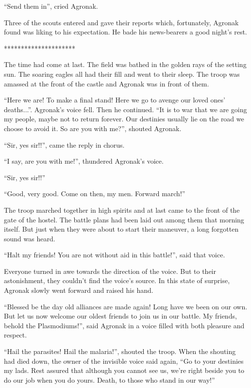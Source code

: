 \documentclass[twoside,11pt,titlepage]{article}
\begin{document}
``Send them in'', cried Agronak.

Three of the scouts entered and gave their reports which, fortunately, Agronak found was liking to his expectation. He bade his news-bearers a good night's rest.

\bigskip
\begin{center}
*********************
\end{center}

The time had come at last. The field was bathed in the golden rays of the setting sun. The soaring eagles all had their fill and went to their sleep. The troop was amassed at the front of the castle and Agronak was in front of them.

``Here we are! To make a final stand! Here we go to avenge our loved ones' deaths...''. Agronak's voice fell. Then he continued. ``It is to war that we are going my people, maybe not to return forever. Our destinies usually lie on the road we choose to avoid it. So are you with me?'', shouted Agronak.

``Sir, yes sir!!'', came the reply in chorus.

``I say, are you with me!'', thundered Agronak's voice.

``Sir, yes sir!!''

``Good, very good. Come on then, my men. Forward march!''

The troop marched together in high spirits and at last came to the front of the gate of the hostel. The battle plans had been laid out among them that morning itself. But just when they were about to start their maneuver, a long forgotten sound was heard.

``Halt my friends! You are not without aid in this battle!'', said that voice.

Everyone turned in awe towards the direction of the voice. But to their astonishment, they couldn't find the voice's source. In this state of surprise, Agronak slowly went forward and raised his hand.

``Blessed be the day old alliances are made again! Long have we been on our own. But let us now welcome our oldest friends to join us in our battle. My friends, behold the Plasmodiums!'', said Agronak in a voice filled with both pleasure and respect.

``Hail the parasites! Hail the malaria!'', shouted the troop. When the shouting had died down, the owner of the invisible voice said again, ``Go to your destinies my lads. Rest assured that although you cannot see us, we're right beside you to do our job when you do yours. Death, to those who stand in our way!''
\end{document}
